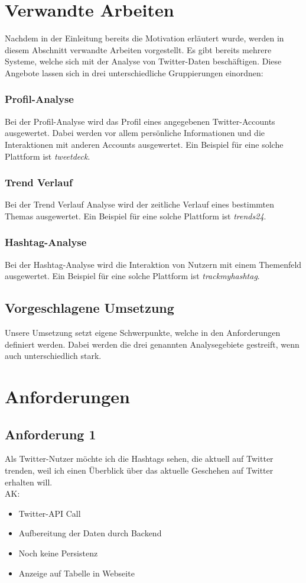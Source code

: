\documentclass[conference]{IEEEtran}
\begin{document}
\section{Verwandte Arbeiten}
Nachdem in der Einleitung bereits die Motivation erläutert wurde, werden in diesem Abschnitt verwandte Arbeiten vorgestellt.
Es gibt bereits mehrere Systeme, welche sich mit der Analyse von Twitter-Daten beschäftigen.
Diese Angebote lassen sich in drei unterschiedliche Gruppierungen einordnen:
\subsubsection*{Profil-Analyse}
Bei der Profil-Analyse wird das Profil eines angegebenen Twitter-Accounts ausgewertet.
Dabei werden vor allem persönliche Informationen und die Interaktionen mit anderen Accounts ausgewertet.
Ein Beispiel für eine solche Plattform ist \textit{tweetdeck}\cite{tweetdeck}.
\subsubsection*{Trend Verlauf}
Bei der Trend Verlauf Analyse wird der zeitliche Verlauf eines bestimmten Themas ausgewertet. Ein Beispiel für eine solche Plattform ist \textit{trends24}\cite{trends24}.
\subsubsection*{Hashtag-Analyse}
Bei der Hashtag-Analyse wird die Interaktion von Nutzern mit einem Themenfeld ausgewertet.
Ein Beispiel für eine solche Plattform ist \textit{trackmyhashtag}\cite{trackmyhashtag}.
\subsection{Vorgeschlagene Umsetzung}
Unsere Umsetzung setzt eigene Schwerpunkte, welche in den Anforderungen definiert werden.
Dabei werden die drei genannten Analysegebiete gestreift, wenn auch unterschiedlich stark.
\section{Anforderungen}

\subsection{Anforderung 1}
Als Twitter-Nutzer möchte ich die Hashtags sehen, die aktuell auf Twitter trenden,
weil ich einen Überblick über das aktuelle Geschehen auf Twitter erhalten will.
\\
AK:
\begin{itemize}
        \item Twitter-API Call
        \item Aufbereitung der Daten durch Backend
        \item Noch keine Persistenz
        \item Anzeige auf Tabelle in Webseite
\end{itemize}
\end{document}
